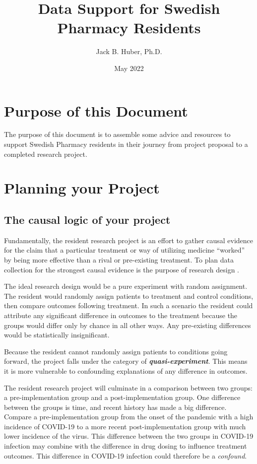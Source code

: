 \documentclass[
]{report}
\title{Data Support for Swedish Pharmacy Residents}
\author{Jack B. Huber, Ph.D.}
\date{May 2022}
\begin{document}
\maketitle

\hypertarget{purpose-of-this-document}{%
\chapter{Purpose of this Document}\label{purpose-of-this-document}}

The purpose of this document is to assemble some advice and resources to
support Swedish Pharmacy residents in their journey from project
proposal to a completed research project.

\hypertarget{planning-your-project}{%
\chapter{Planning your Project}\label{planning-your-project}}

\hypertarget{the-causal-logic-of-your-project}{%
\section{The causal logic of your
project}\label{the-causal-logic-of-your-project}}

Fundamentally, the resident research project is an effort to gather
causal evidence for the claim that a particular treatment or way of
utilizing medicine ``worked'' by being more effective than a rival or
pre-existing treatment. To plan data collection for the strongest causal
evidence is the purpose of research design \citep{CampbellStanley1963}.

The ideal research design would be a pure experiment with random
assignment. The resident would randomly assign patients to treatment and
control conditions, then compare outcomes following treatment. In such a
scenario the resident could attribute any significant difference in
outcomes to the treatment because the groups would differ only by chance
in all other ways. Any pre-existing differences would be statistically
insignificant.

Because the resident cannot randomly assign patients to conditions going
forward, the project falls under the category of
\emph{\textbf{quasi-experiment}}. This means it is more vulnerable to
confounding explanations of any difference in outcomes.

The resident research project will culminate in a comparison between two
groups: a pre-implementation group and a post-implementation group. One
difference between the groups is time, and recent history has made a big
difference. Compare a pre-implementation group from the onset of the
pandemic with a high incidence of COVID-19 to a more recent
post-implementation group with much lower incidence of the virus. This
difference between the two groups in COVID-19 infection may combine with
the difference in drug dosing to influence treatment outcomes. This
difference in COVID-19 infection could therefore be a \emph{confound}.
\end{document}
